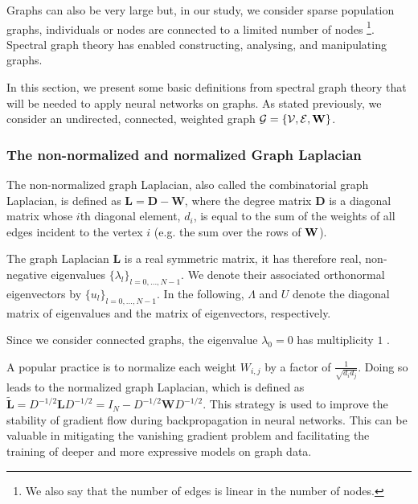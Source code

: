 Graphs can also be very large but, in our study, we consider sparse population graphs, \ie individuals or nodes are connected to a limited number of nodes \footnote{We also say that the number of edges is linear in the number of nodes.}.
Spectral graph theory has enabled constructing, analysing, and manipulating graphs.


In this section, we present some basic definitions from spectral graph theory that will be needed to apply neural networks on graphs. As stated previously, we consider an undirected, connected, weighted graph $\mathcal{G} = \{\mathcal{V}, \mathcal{E}, \mathbf{W}\}$. 

\subsubsection{The non-normalized and normalized Graph Laplacian}

The non-normalized graph Laplacian, also called the combinatorial graph Laplacian, is defined 
as $\mathbf{L} = \mathbf{D}-\mathbf{W}$, where the degree matrix $\mathbf{D}$ 
is a diagonal matrix 
whose $i$th diagonal element, $d_i$, is equal to the sum of the weights of all edges incident to the vertex $i$
(e.g. the sum over the rows of $\mathbf{W}$).

The graph Laplacian $\mathbf{L}$ is a real symmetric matrix, it has therefore real, non-negative eigenvalues $\{\lambda_l\}_{l=0, \dots, N-1}$. 
We denote their associated  orthonormal eigenvectors by $\{u_l\}_{l=0,\dots, N-1}$. In the following, $\Lambda$ and $U$ denote the diagonal matrix of eigenvalues and the matrix of eigenvectors, respectively.

Since we consider connected graphs, the eigenvalue $\lambda_0=0$ has multiplicity $1$  \cite{shuman_emerging_2013}. 

A popular practice is to normalize each weight $W_{i, j}$ by a factor of $\frac{1}{\sqrt{d_id_j}}$.
Doing so leads to the normalized graph Laplacian, which is defined as $\widetilde{\mathbf{L}} = D^{-1/2}\mathbf{L}D^{-1/2} = I_N - D^{-1/2}\mathbf{W}D^{-1/2}$. This strategy is used to improve the stability of gradient flow during backpropagation in neural networks. This can be valuable in mitigating the vanishing gradient problem and facilitating the training of deeper and more expressive models on graph data.


